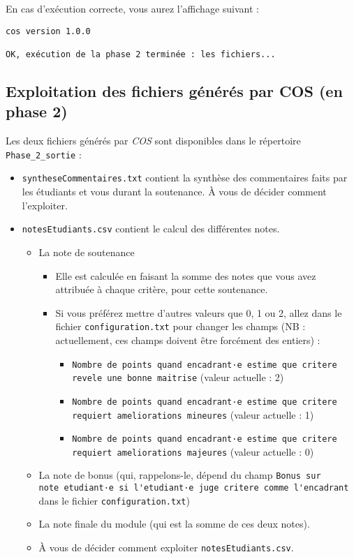 \documentclass[11pt]{article}
\begin{document}
En cas d'exécution correcte, vous aurez l'affichage suivant :
\begin{verbatim}
cos version 1.0.0

OK, exécution de la phase 2 terminée : les fichiers...
\end{verbatim}
\subsection{Exploitation des fichiers générés par COS (en phase 2)}
\label{sec-6-3}
Les deux fichiers générés par \emph{COS} sont disponibles dans le
répertoire \verb~Phase_2_sortie~ :
\begin{itemize}
\item \verb~syntheseCommentaires.txt~ contient la synthèse des commentaires
faits par les étudiants et vous durant la soutenance. À vous de
décider comment l'exploiter.
\item \verb~notesEtudiants.csv~ contient le calcul des différentes notes.
\begin{itemize}
\item La note de soutenance
\begin{itemize}
\item Elle est calculée en faisant la somme des notes que vous avez
attribuée à chaque critère, pour cette soutenance.
\item Si vous préférez mettre d'autres valeurs que 0, 1 ou 2, allez
dans le fichier \verb~configuration.txt~ pour changer les champs
(NB : actuellement, ces champs doivent être forcément des
entiers) :
\begin{itemize}
\item \verb~Nombre de points quand encadrant·e estime que critere revele une bonne maitrise~ (valeur actuelle : 2)
\item \verb~Nombre de points quand encadrant·e estime que critere requiert ameliorations mineures~ (valeur actuelle : 1)
\item \verb~Nombre de points quand encadrant·e estime que critere requiert ameliorations majeures~ (valeur actuelle : 0)
\end{itemize}
\end{itemize}
\item La note de bonus (qui, rappelons-le, dépend du champ \verb~Bonus sur     note etudiant·e si l'etudiant·e juge critere comme l'encadrant~
    dans le fichier \verb~configuration.txt~)
\item La note finale du module (qui est la somme de ces deux notes).
\item À vous de décider comment exploiter \verb~notesEtudiants.csv~.
\end{itemize}
\end{itemize}
\end{document}
